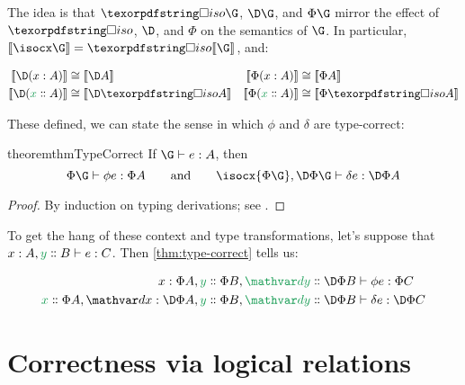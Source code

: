 \noindent
The idea is that $\isof\G$, $\D\G$, and $\Phi\G$ mirror the effect of $\iso$,
$\D$, and $\Phi$ on the semantics of $\G$. In particular, $\den{\isocx\G} =
\isof{\den\G}$, and:

\nopagebreak[2]
\begin{align*}
  \den{\D(\h x A)} &\cong \den{\D A}
  &
  \den{\Phi(\h x A)} &\cong \den{\Phi A}
  \\
  \den{\D(\hd x A)} &\cong \den{\D \isof A}
  &
  \den{\Phi(\hd x A)} &\cong \den{\Phi \isof A}
\end{align*}

\noindent
These defined, we can state the sense in which $\phi$ and $\delta$ are
type-correct:

\begin{restatable}{theorem}{thmTypeCorrect}
  \label{thm:type-correct}
  If $\J e \G A$, then
  \[ \J {\phi e} {\Phi\G} {\Phi A}
  \qquad\text{and}\qquad
  \J {\delta e} {\isocx{\Phi\G}, \DP\G} {\DP A}
  \]
\end{restatable}
\begin{proof}
  By induction on typing derivations; see .
\end{proof}

\noindent To get the hang of these context and type transformations, let's
suppose that $\J e {\h x A, \hd y B} C$. Then \cref{thm:type-correct} tells us:

\nopagebreak[2]
\begin{align*}
  \Jalign {\phi e} {\h x {\Phi A}, \hd y {\Phi B}, \hd \dy {\DP B}} {\Phi C}
  \\
  \Jalign {\delta e} {\hd x {\Phi A}, \h\dx{\DP A}, \hd y {\Phi B}, \hd \dy {\DP B}} {\DP C}
\end{align*}


\section{Correctness via logical relations}
\label{sec:logical-relations}

